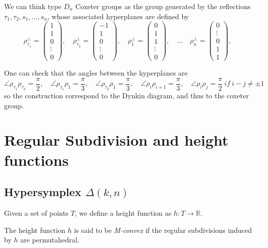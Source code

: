 \documentclass{myclass}
\begin{document}
We can think type $D_n$ Coxeter groups as the group generated by the reflections  $\tau_1, \tau_2, s_1, \ldots, s_n$, whose associated hyperplanes are defined by
\[
\rho_{\tau_1} ^\perp = \begin{pmatrix} 1 \\ 1 \\ 0 \\  \vdots \\ 0 \end{pmatrix} , \quad 
\rho_{\tau_2} ^\perp = \begin{pmatrix} -1 \\ 1 \\ 0\\ \vdots \\ 0 \end{pmatrix} , \quad 
\rho_1 ^\perp = \begin{pmatrix} 0 \\ 1 \\ 1\\ \vdots \\ 0 \end{pmatrix} , \quad \ldots \quad
\rho_n ^\perp = \begin{pmatrix} 0 \\ \vdots \\ 0 \\ 1\\ 1 \end{pmatrix} , \quad 
\] 

One can check that the angles between the hyperplanes are
\[
\angle \rho_{\tau_1} \rho _{\tau _2} = \frac{\pi}{2}, \quad
\angle \rho_{\tau_1} \rho _{1} = \frac{\pi}{3}, \quad
\angle \rho_{\tau_2} \rho _{1} = \frac{\pi}{3}, \quad
\angle \rho_i \rho _{i+1} = \frac{\pi}{3}, \quad 
\angle \rho_i \rho _{j} = \frac{\pi}{2}\ if\ i-j\neq \pm 1 \quad 
\] 
so the construction correspond to the Dynkin diagram, and thus to the coxeter group.


\section{Regular Subdivision and height functions}
\subsection{Hypersymplex $\Delta(k, n)$}
Given a set of points $T$, we define a height function as  $h:T \to \mathbb{R}$.

The height function $h$ is said to be \textit{M-convex} if the regular subdivisions induced by $h$ are permutahedral.
\end{document}
